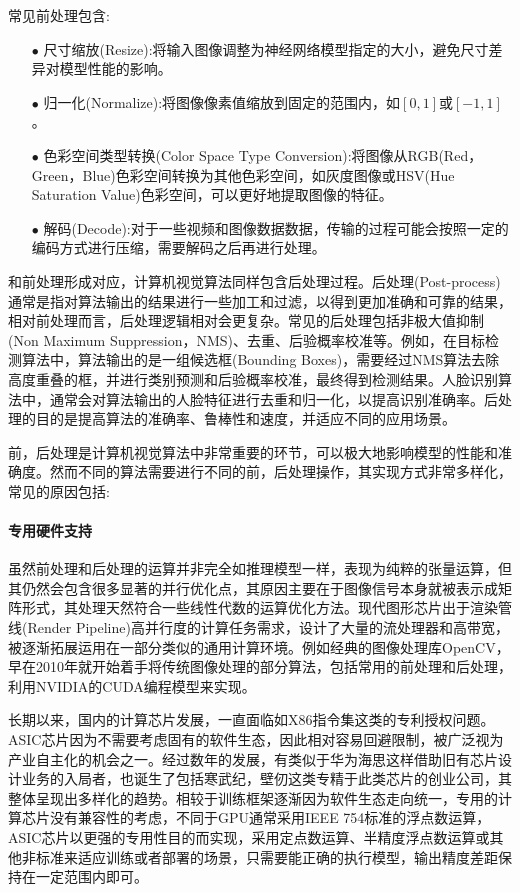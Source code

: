 \documentclass[master,anonymous]{shtthesis}
\begin{document}
常见前处理包含:
\begin{itemize}
	\item[$\bullet$]尺寸缩放(Resize):将输入图像调整为神经网络模型指定的大小，避免尺寸差异对模型性能的影响。
	\item[$\bullet$]归一化(Normalize):将图像像素值缩放到固定的范围内，如$[0,1]$或$[-1,1]$。
	\item[$\bullet$]色彩空间类型转换(Color Space Type Conversion):将图像从RGB(Red，Green，Blue)色彩空间转换为其他色彩空间，如灰度图像或HSV(Hue Saturation Value)色彩空间，可以更好地提取图像的特征。
	\item[$\bullet$]解码(Decode):对于一些视频和图像数据数据，传输的过程可能会按照一定的编码方式进行压缩，需要解码之后再进行处理。
\end{itemize}

和前处理形成对应，计算机视觉算法同样包含后处理过程。后处理(Post-process)通常是指对算法输出的结果进行一些加工和过滤，以得到更加准确和可靠的结果，相对前处理而言，后处理逻辑相对会更复杂。常见的后处理包括非极大值抑制(Non Maximum Suppression，NMS)\cite{bodla2017soft}、去重、后验概率校准等。例如，在目标检测算法中，算法输出的是一组候选框(Bounding Boxes)，需要经过NMS算法去除高度重叠的框，并进行类别预测和后验概率校准，最终得到检测结果。人脸识别算法中，通常会对算法输出的人脸特征进行去重和归一化，以提高识别准确率。后处理的目的是提高算法的准确率、鲁棒性和速度，并适应不同的应用场景。

前，后处理是计算机视觉算法中非常重要的环节，可以极大地影响模型的性能和准确度。然而不同的算法需要进行不同的前，后处理操作，其实现方式非常多样化，常见的原因包括:
\paragraph{专用硬件支持}虽然前处理和后处理的运算并非完全如推理模型一样，表现为纯粹的张量运算，但其仍然会包含很多显著的并行优化点，其原因主要在于图像信号本身就被表示成矩阵形式，其处理天然符合一些线性代数的运算优化方法。现代图形芯片出于渲染管线(Render Pipeline)高并行度的计算任务需求，设计了大量的流处理器和高带宽，被逐渐拓展运用在一部分类似的通用计算环境。例如经典的图像处理库OpenCV\cite{bradski2000opencv}，早在2010年就开始着手将传统图像处理的部分算法，包括常用的前处理和后处理，利用NVIDIA的CUDA\cite{sanders2010cuda}编程模型来实现。

长期以来，国内的计算芯片发展，一直面临如X86指令集这类的专利授权问题。ASIC芯片因为不需要考虑固有的软件生态，因此相对容易回避限制，被广泛视为产业自主化的机会之一。经过数年的发展，有类似于华为海思这样借助旧有芯片设计业务的入局者，也诞生了包括寒武纪，壁仞这类专精于此类芯片的创业公司，其整体呈现出多样化的趋势。相较于训练框架逐渐因为软件生态走向统一，专用的计算芯片没有兼容性的考虑，不同于GPU通常采用IEEE 754标准的浮点数运算，ASIC芯片以更强的专用性目的而实现，采用定点数运算、半精度浮点数运算或其他非标准来适应训练或者部署的场景，只需要能正确的执行模型，输出精度差距保持在一定范围内即可。
\end{document}
